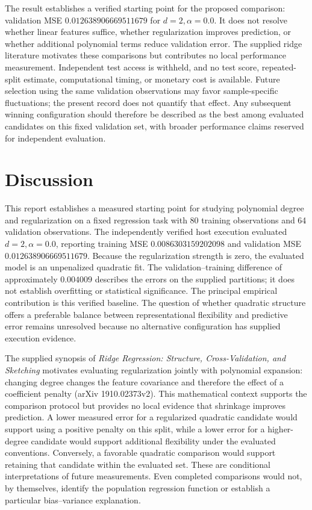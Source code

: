 \documentclass[11pt]{article}
\begin{document}
The result establishes a verified starting point for the proposed comparison: validation MSE \(0.012638906669511679\) for \(d=2,\alpha=0.0\). It does not resolve whether linear features suffice, whether regularization improves prediction, or whether additional polynomial terms reduce validation error. The supplied ridge literature motivates these comparisons but contributes no local performance measurement. Independent test access is withheld, and no test score, repeated-split estimate, computational timing, or monetary cost is available. Future selection using the same validation observations may favor sample-specific fluctuations; the present record does not quantify that effect. Any subsequent winning configuration should therefore be described as the best among evaluated candidates on this fixed validation set, with broader performance claims reserved for independent evaluation.

\section{Discussion}
This report establishes a measured starting point for studying polynomial degree and regularization on a fixed regression task with 80 training observations and 64 validation observations. The independently verified host execution evaluated \(d=2,\alpha=0.0\), reporting training MSE \(0.0086303159202098\) and validation MSE \(0.012638906669511679\). Because the regularization strength is zero, the evaluated model is an unpenalized quadratic fit. The validation--training difference of approximately \(0.004009\) describes the errors on the supplied partitions; it does not establish overfitting or statistical significance. The principal empirical contribution is this verified baseline. The question of whether quadratic structure offers a preferable balance between representational flexibility and predictive error remains unresolved because no alternative configuration has supplied execution evidence.

The supplied synopsis of \textit{Ridge Regression: Structure, Cross-Validation, and Sketching} motivates evaluating regularization jointly with polynomial expansion: changing degree changes the feature covariance and therefore the effect of a coefficient penalty (arXiv 1910.02373v2). This mathematical context supports the comparison protocol but provides no local evidence that shrinkage improves prediction. A lower measured error for a regularized quadratic candidate would support using a positive penalty on this split, while a lower error for a higher-degree candidate would support additional flexibility under the evaluated conventions. Conversely, a favorable quadratic comparison would support retaining that candidate within the evaluated set. These are conditional interpretations of future measurements. Even completed comparisons would not, by themselves, identify the population regression function or establish a particular bias--variance explanation.
\end{document}
